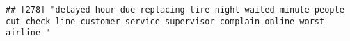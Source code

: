 \documentclass[
]{article}
\begin{document}
\begin{verbatim}
## [278] "delayed hour due replacing tire night waited minute people cut check line customer service supervisor complain online worst airline "                                                                                                                                                                                                                                                                                                                                                                                                                                                                                                                                                                                                                                                                                                                                                                                                                                                                                                                                                                                                                                                                                                                                                                                                                                                                                                                                                                                                                                                                                                                                                                                                                                                          

\end{verbatim}
\end{document}
